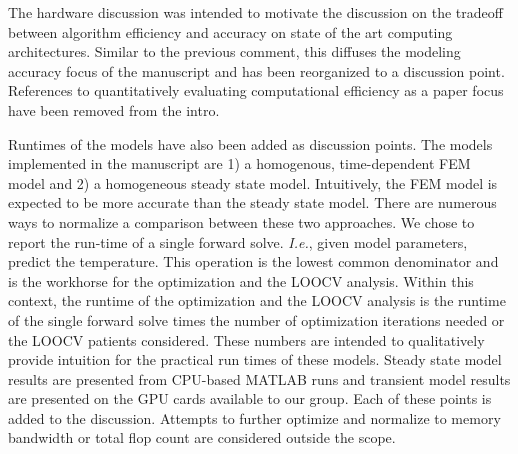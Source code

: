 \documentclass[letterpaper,12pt]{report}
\begin{document}
\begin{enumerate}
{\color{red}
The hardware discussion was intended to
motivate the discussion on the tradeoff between algorithm efficiency and
accuracy on state of the art computing architectures. 
Similar to the previous comment, this diffuses the modeling accuracy focus of the 
manuscript and has been reorganized to a discussion point.
References to quantitatively evaluating computational efficiency as a paper
focus have been removed from the intro.

Runtimes of the models have also been added as discussion points.
The models implemented in the manuscript are 1) a homogenous,
time-dependent FEM model and 2) a homogeneous steady state model.
Intuitively, the FEM model is expected to be more accurate than the steady state model.
There are numerous ways to normalize a comparison between these two
approaches. We chose to report the run-time of a single forward solve.
\textit{I.e.}, given model parameters, predict the temperature. This operation is the
lowest common denominator and is the workhorse for the optimization and the
LOOCV analysis. Within this context, the runtime of the optimization and the
LOOCV analysis is the runtime of the single forward solve times the number
of optimization iterations needed or the LOOCV patients considered.
These numbers are intended to qualitatively provide
intuition for the practical run times of these models. 
Steady state model
results are presented from CPU-based MATLAB runs and transient model results are
presented on the GPU cards available to our group. 
Each of these points
is added to the discussion.
Attempts to further optimize and normalize to memory bandwidth or total
flop count are considered outside the scope. 

}
\end{enumerate}
\end{document}
